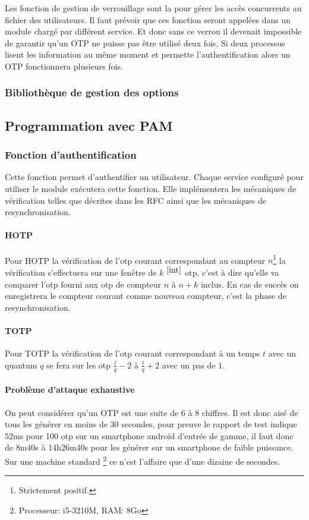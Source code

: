 Les fonction de gestion de verrouillage sont la pour gérer les accès concurrents
au fichier des utilisateurs. Il faut prévoir que ces fonction seront appelées
dans un module chargé par différent service. Et donc sans ce verrou il devenait
impossible de garantir qu'un OTP ne puisse pas être utilisé deux fois, Si deux
processus lisent les information au même moment et permette l'authentification
alors un OTP fonctionnera plusieurs fois.

\subsubsection{Bibliothèque de gestion des options}


\subsection{Programmation avec PAM}
\subsubsection{Fonction d'authentification}
Cette fonction permet d'authentifier un utilisateur. Chaque service configuré
pour utiliser le module exécutera cette fonction. Elle implémentera les
mécaniques de vérification telles que décrites dans les RFC ainsi que les
mécaniques de resynchronisation.
\paragraph{HOTP}
Pour HOTP la vérification de l'otp courant correspondant au compteur
$n$\footnote{Strictement positif.\label{int}} la vérification s'effectuera sur
une fenêtre de  $k$ $^{\ref{int}}$ otp, c'est à dire qu'elle va comparer l'otp
fourni aux otp de compteur $n$ à $n+k$ inclus. En cas de succès on enregistrera
le compteur courant comme nouveau compteur, c'est la phase de resynchronisation.
\paragraph{TOTP}
Pour TOTP la vérification de l'otp courant correspondant à un temps $t$ avec un
quantum $q$ se fera sur les otp $\frac{t}{q} - 2$ à $\frac{t}{q} + 2$ avec un
pas de $1$.
\paragraph{Problème d'attaque exhaustive}
On peut considérer qu'un OTP est une suite de 6 à 8 chiffres. Il est donc aisé
de tous les générer en moins de 30 secondes, pour preuve le rapport de test
indique 52ms pour 100 otp sur un smartphone android d'entrée de gamme,
il faut donc de 8m40s à 14h26m40s pour les générer sur un smartphone de faible
puissance. Sur une machine standard \footnote{Processeur: i5-3210M, RAM: 8Go} ce
n'est l'affaire que d'une dizaine de secondes.


